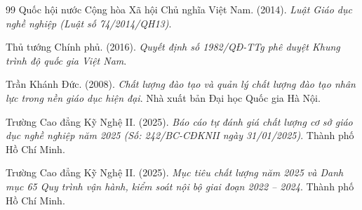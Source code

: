 \begin{thebibliography}{99}
Quốc hội nước Cộng hòa Xã hội Chủ nghĩa Việt Nam. (2014). \textit{Luật Giáo dục nghề nghiệp (Luật số 74/2014/QH13)}.

Thủ tướng Chính phủ. (2016). \textit{Quyết định số 1982/QĐ-TTg phê duyệt Khung trình độ quốc gia Việt Nam}.

Trần Khánh Đức. (2008). \textit{Chất lượng đào tạo và quản lý chất lượng đào tạo nhân lực trong nền giáo dục hiện đại}. Nhà xuất bản Đại học Quốc gia Hà Nội.

Trường Cao đẳng Kỹ Nghệ II. (2025). \textit{Báo cáo tự đánh giá chất lượng cơ sở giáo dục nghề nghiệp năm 2025 (Số: 242/BC-CĐKNII ngày 31/01/2025)}. Thành phố Hồ Chí Minh.

Trường Cao đẳng Kỹ Nghệ II. (2025). \textit{Mục tiêu chất lượng năm 2025 và Danh mục 65 Quy trình vận hành, kiểm soát nội bộ giai đoạn 2022 -- 2024}. Thành phố Hồ Chí Minh.

\end{thebibliography}
